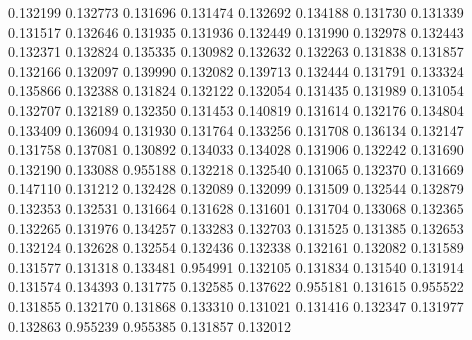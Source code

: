 0.132199
0.132773
0.131696
0.131474
0.132692
0.134188
0.131730
0.131339
0.131517
0.132646
0.131935
0.131936
0.132449
0.131990
0.132978
0.132443
0.132371
0.132824
0.135335
0.130982
0.132632
0.132263
0.131838
0.131857
0.132166
0.132097
0.139990
0.132082
0.139713
0.132444
0.131791
0.133324
0.135866
0.132388
0.131824
0.132122
0.132054
0.131435
0.131989
0.131054
0.132707
0.132189
0.132350
0.131453
0.140819
0.131614
0.132176
0.134804
0.133409
0.136094
0.131930
0.131764
0.133256
0.131708
0.136134
0.132147
0.131758
0.137081
0.130892
0.134033
0.134028
0.131906
0.132242
0.131690
0.132190
0.133088
0.955188
0.132218
0.132540
0.131065
0.132370
0.131669
0.147110
0.131212
0.132428
0.132089
0.132099
0.131509
0.132544
0.132879
0.132353
0.132531
0.131664
0.131628
0.131601
0.131704
0.133068
0.132365
0.132265
0.131976
0.134257
0.133283
0.132703
0.131525
0.131385
0.132653
0.132124
0.132628
0.132554
0.132436
0.132338
0.132161
0.132082
0.131589
0.131577
0.131318
0.133481
0.954991
0.132105
0.131834
0.131540
0.131914
0.131574
0.134393
0.131775
0.132585
0.137622
0.955181
0.131615
0.955522
0.131855
0.132170
0.131868
0.133310
0.131021
0.131416
0.132347
0.131977
0.132863
0.955239
0.955385
0.131857
0.132012
